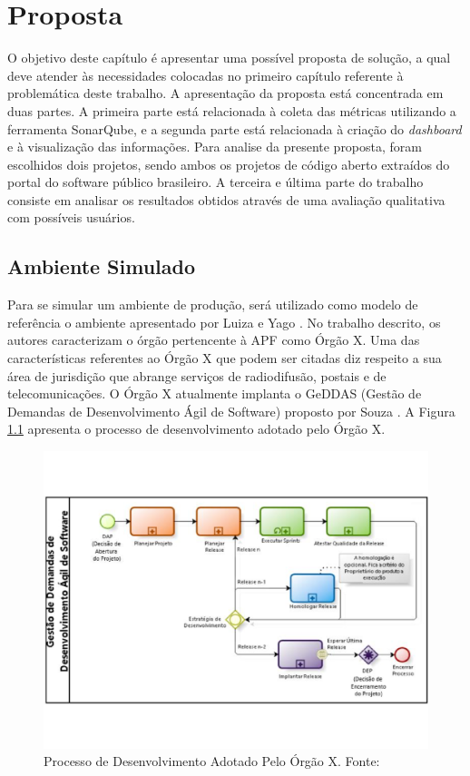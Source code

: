 \chapter[Proposta]{Proposta}
O objetivo deste capítulo é apresentar uma possível proposta de solução, a qual deve atender às necessidades colocadas no primeiro capítulo referente à problemática deste trabalho. A apresentação da proposta está concentrada em duas partes. A primeira parte está relacionada à coleta das métricas utilizando a ferramenta SonarQube, e a segunda parte está relacionada à criação do \textit{dashboard} e à visualização das informações. Para analise da presente proposta, foram escolhidos dois projetos, sendo ambos os projetos de código aberto extraídos do portal do software público brasileiro. A terceira e última parte do trabalho consiste em analisar os resultados obtidos através de uma avaliação qualitativa com possíveis usuários.

\section{Ambiente Simulado}
Para se simular um ambiente de produção, será utilizado como modelo de referência o ambiente apresentado por Luiza e Yago \cite{luiza_yago}. No trabalho descrito, os autores caracterizam o órgão pertencente à APF como Órgão X. Uma das características referentes ao Órgão X que podem ser citadas diz respeito a sua área de jurisdição que abrange serviços de radiodifusão, postais e de telecomunicações. O Órgão X atualmente implanta o GeDDAS (Gestão de Demandas de Desenvolvimento Ágil de Software) proposto por Souza \cite{ouza_sobrinho_uso_2014}. A Figura \ref{img:proc_des} apresenta o processo de desenvolvimento adotado pelo Órgão X.

\graphicspath{{figuras/}}
\begin{figure}[h!]
\centering
\includegraphics[scale=0.40]{Proc_des.pdf}
\caption{Processo de Desenvolvimento Adotado Pelo Órgão X. Fonte: \cite{luiza_yago}}
\label{img:proc_des}
\end{figure}




